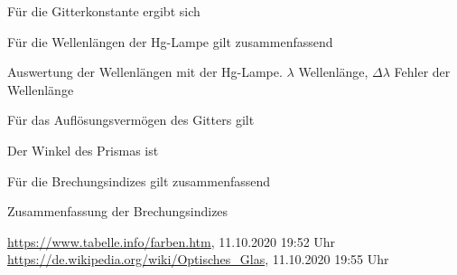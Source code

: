 \documentclass{article}
\begin{document}
Für die Gitterkonstante ergibt sich


Für die Wellenlängen der Hg-Lampe gilt zusammenfassend
\begin{table}[H]
\caption{Auswertung der Wellenlängen mit der Hg-Lampe. $\lambda$ Wellenlänge, $\Delta\lambda$ Fehler der Wellenlänge}
\centering

\end{table}

Für das Auflösungsvermögen des Gitters gilt


Der Winkel des Prismas ist



Für die Brechungsindizes gilt zusammenfassend
\begin{table}[H]
\caption{Zusammenfassung der Brechungsindizes}
\centering

\end{table}





\begin{thebibliography}{9}
 \url{https://www.tabelle.info/farben.htm}, 11.10.2020 19:52 Uhr
 \url{https://de.wikipedia.org/wiki/Optisches_Glas}, 11.10.2020 19:55 Uhr
\end{thebibliography}






%

%


%
\end{document}
